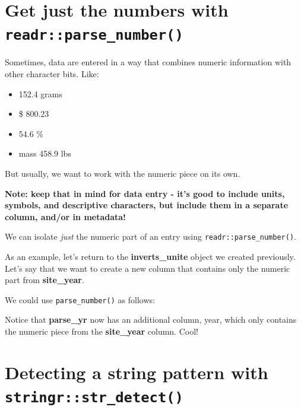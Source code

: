 \documentclass[]{book}
\newenvironment{Shaded}{\begin{snugshade}}{\end{snugshade}}
\newcommand{\DataTypeTok}[1]{\textcolor[rgb]{0.13,0.29,0.53}{#1}}
\newcommand{\KeywordTok}[1]{\textcolor[rgb]{0.13,0.29,0.53}{\textbf{#1}}}
\newcommand{\NormalTok}[1]{#1}
\newcommand{\OperatorTok}[1]{\textcolor[rgb]{0.81,0.36,0.00}{\textbf{#1}}}
\newcommand{\StringTok}[1]{\textcolor[rgb]{0.31,0.60,0.02}{#1}}
\providecommand{\tightlist}{%
  \setlength{\itemsep}{0pt}\setlength{\parskip}{0pt}}
\begin{document}
\hypertarget{get-just-the-numbers-with-readrparse_number}{%
\section{\texorpdfstring{Get just the numbers with \texttt{readr::parse\_number()}}{Get just the numbers with readr::parse\_number()}}\label{get-just-the-numbers-with-readrparse_number}}

Sometimes, data are entered in a way that combines numeric information with other character bits. Like:

\begin{itemize}
\tightlist
\item
  152.4 grams
\item
  \$ 800.23
\item
  54.6 \%
\item
  mass 458.9 lbs
\end{itemize}

But usually, we want to work with the numeric piece on its own.

\textbf{Note: keep that in mind for data entry - it's good to include units, symbols, and descriptive characters, but include them in a separate column, and/or in metadata!}

We can isolate \emph{just} the numeric part of an entry using \texttt{readr::parse\_number()}.

As an example, let's return to the \textbf{inverts\_unite} object we created previously. Let's say that we want to create a new column that contains only the numeric part from \textbf{site\_year}.

We could use \texttt{parse\_number()} as follows:

\begin{Shaded}
\end{Shaded}

Notice that \textbf{parse\_yr} now has an additional column, year, which only contains the numeric piece from the \textbf{site\_year} column. Cool!

\hypertarget{detecting-a-string-pattern-with-stringrstr_detect}{%
\section{\texorpdfstring{Detecting a string pattern with \texttt{stringr::str\_detect()}}{Detecting a string pattern with stringr::str\_detect()}}\label{detecting-a-string-pattern-with-stringrstr_detect}}
\end{document}
